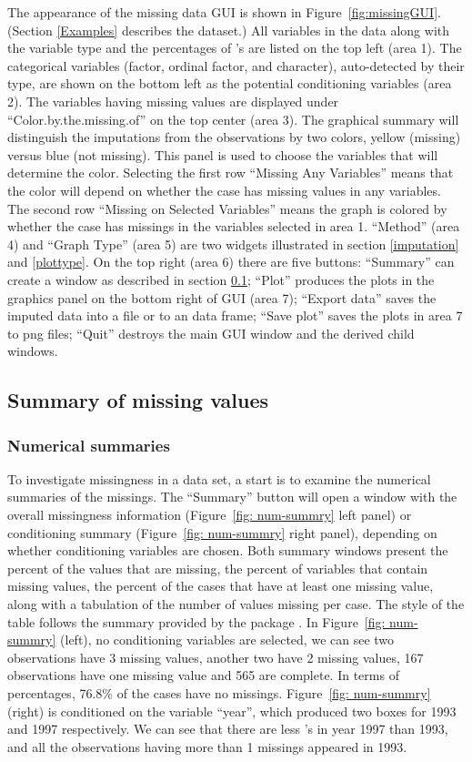 \documentclass[article]{jss}
\begin{document}
The appearance of the missing data GUI is shown in Figure~\ref{fig:missingGUI}. (Section \ref{Examples} describes the dataset.) All variables in the data along with the variable type and the percentages of 's are listed on the top left (area 1). The categorical variables (factor, ordinal factor, and character), auto-detected by their type, are shown on the bottom left as the potential conditioning variables (area 2). The variables having missing values are displayed under ``Color.by.the.missing.of'' on the top center (area 3). The graphical summary will distinguish the imputations from the observations by two colors, yellow (missing) versus blue (not missing). This panel is used to choose the variables that will determine the color. Selecting the first row ``Missing Any Variables'' means that the color will depend on whether the case has missing values in any variables. The second row ``Missing on Selected Variables'' means the graph is colored by whether the case has missings in the variables selected in area 1. ``Method'' (area 4) and ``Graph Type'' (area 5) are two widgets illustrated in section \ref{imputation} and \ref{plottype}. On the top right (area 6) there are five buttons: ``Summary'' can create a window as described in section \ref{numsum}; ``Plot'' produces the plots in the graphics panel on the bottom right of GUI (area 7); ``Export data'' saves the imputed data into a file or to an  data frame; ``Save plot'' saves the plots in area 7 to png files; ``Quit'' destroys the main GUI window and the derived child windows.

\subsection{Summary of missing values}\label{numsum}

\subsubsection{Numerical summaries}
To investigate missingness in a data set, a start is to examine the numerical summaries of the missings. The ``Summary'' button will open a window with the overall missingness information (Figure~\ref{fig: num-summry} left panel) or conditioning summary (Figure~\ref{fig: num-summry} right panel), depending on whether conditioning variables are chosen. Both summary windows present the percent of the values that are missing, the percent of variables that contain missing values, the percent of the cases that have at least one missing value, along with a tabulation of the number of values missing per case. The style of the table follows the summary provided by the package .  In Figure~\ref{fig: num-summry} (left), no conditioning variables are selected, we can see two observations have 3 missing values, another two have 2 missing values, 167 observations have one missing value and 565 are complete. In terms of percentages, 76.8\% of the cases have no missings. Figure~\ref{fig: num-summry} (right) is conditioned on the variable ``year'', which produced two boxes for 1993 and 1997 respectively. We can see that there are less 's in year 1997 than 1993, and all the observations having more than 1 missings appeared in 1993.
\end{document}
